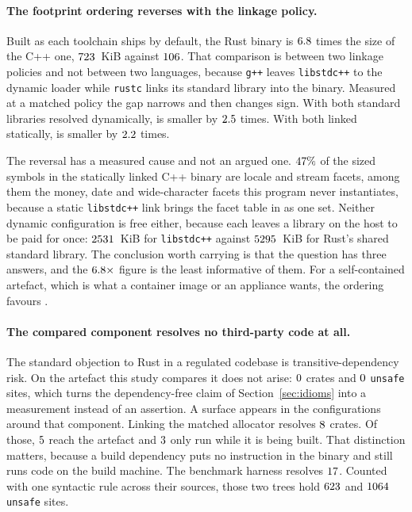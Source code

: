 \documentclass[english,oneside,a4paper,censored,csm,software-track-2020]{HYthesisML}
\begin{document}
\paragraph{The footprint ordering reverses with the linkage policy.}
Built as each toolchain ships by default, the Rust \texttt{\FootTarget} binary is
$6.8$ times the size of the C++ one, $723$~KiB against
$106$. That comparison is between two linkage policies and not between two languages,
because \texttt{g++} leaves \texttt{libstdc++} to the dynamic loader while \texttt{rustc} links its
standard library into the binary. Measured at a matched policy the gap narrows and then changes
sign. With both standard libraries resolved dynamically, \FootDynamicSmaller{} is smaller by
$2.5$ times. With both linked statically, \FootStaticSmaller{} is smaller by
$2.2$ times.

The reversal has a measured cause and not an argued one. $47\%$ of the sized
symbols in the statically linked C++ binary are locale and stream facets, among them the money,
date and wide-character facets this program never instantiates, because a static
\texttt{libstdc++} link brings the facet table in as one set. Neither dynamic configuration is
free either, because each leaves a library on the host to be paid for once: $2531$~KiB
for \texttt{libstdc++} against $5295$~KiB for Rust's shared standard library. The
conclusion worth carrying is that the question has three answers, and the $6.8\times$
figure is the least informative of them. For a self-contained artefact, which is what a container
image or an appliance wants, the ordering favours \FootStaticSmaller{}.

\paragraph{The compared component resolves no third-party code at all.}
The standard objection to Rust in a regulated codebase is transitive-dependency risk. On the
artefact this study compares it does not arise: $0$ crates and $0$
\texttt{unsafe} sites, which turns the dependency-free claim of Section~\ref{sec:idioms} into a
measurement instead of an assertion. A surface appears in the configurations around that
component. Linking the matched allocator resolves $8$ crates. Of those,
$5$ reach the artefact and $3$ only run while it is being
built. That distinction matters, because a build dependency puts no instruction in the
binary and still runs code on the build machine. The benchmark harness resolves $17$.
Counted with one syntactic rule across their sources, those two trees hold
$623$ and $1064$ \texttt{unsafe} sites.
\end{document}

